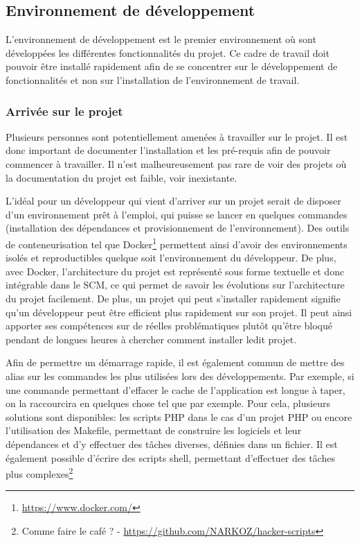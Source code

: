 \subsection{Environnement de développement}

L'environnement de développement est le premier environnement où sont développées les différentes fonctionnalités du projet. Ce cadre de travail doit pouvoir être installé rapidement afin de se concentrer sur le développement de fonctionnalités et non sur l'installation de l'environnement de travail.

\subsubsection{Arrivée sur le projet}

Plusieurs personnes sont potentiellement amenées à travailler sur le projet. Il est donc important de documenter l'installation et les pré-requis afin de pouvoir commencer à travailler. Il n'est malheureusement pas rare de voir des projets où la documentation du projet est faible, voir inexistante.

L'idéal pour un développeur qui vient d'arriver sur un projet serait de disposer d'un environnement prêt à l'emploi, qui puisse se lancer en quelques commandes (installation des dépendances et provisionnement de l'environnement). Des outils de conteneurisation tel que Docker\footnote{\url{https://www.docker.com/}} permettent ainsi d'avoir des environnements isolés et reproductibles quelque soit l'environnement du développeur. De plus, avec Docker, l'architecture du projet est représenté sous forme textuelle et donc intégrable dans le \gls{SCM}, ce qui permet de savoir les évolutions sur l'architecture du projet facilement. De plus, un projet qui peut s'installer rapidement signifie qu'un développeur peut être efficient plus rapidement sur son projet. Il peut ainsi apporter ses compétences sur de réelles problématiques plutôt qu'être bloqué pendant de longues heures à chercher comment installer ledit projet.

Afin de permettre un démarrage rapide, il est également commun de mettre des alias sur les commandes les plus utilisées lors des développements. Par exemple, si une commande permettant d'effacer le cache de l'application est longue à taper, on la raccourcira en quelques chose tel que  par exemple. Pour cela, plusieurs solutions sont disponibles: les scripts \gls{PHP} dans le cas d'un projet \gls{PHP} ou encore l'utilisation des Makefile, permettant de construire les logiciels et leur dépendances et d'y effectuer des tâches diverses, définies dans un fichier. Il est également possible d'écrire des scripts shell, permettant d'effectuer des tâches plus complexes\footnote{Comme faire le café ?  - \url{https://github.com/NARKOZ/hacker-scripts}}

